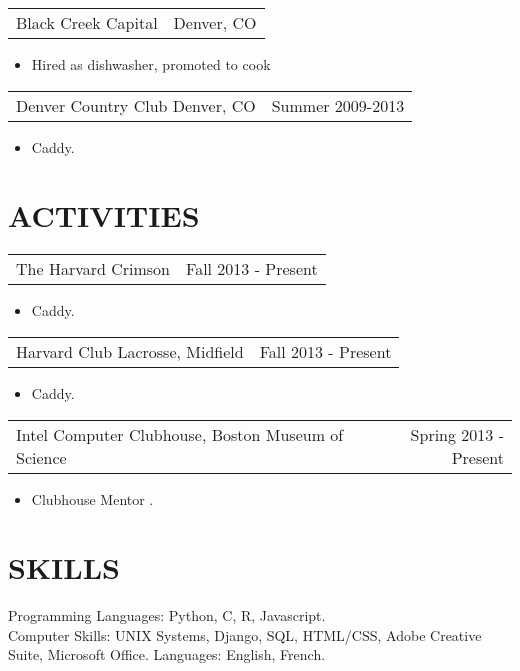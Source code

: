 \documentclass[margin]{res}
\begin{document}
\begin{resume}
		 \begin{tabular}{p{3in} r}
                 Black Creek Capital &  Denver, CO 
         \end{tabular}	
		 \begin{itemize}
                   \item[] Hired as dishwasher, promoted to cook 
         \end{itemize}

         \begin{tabular}{p{3in} r} 
          Denver Country Club Denver, CO &  Summer 2009-2013 
         \end{tabular}
         \begin{itemize}					        
                  \item[] Caddy.  
         \end{itemize}
 
\section{ACTIVITIES}
         \begin{tabular}{p{3in} r} 
                The Harvard Crimson & Fall 2013 - Present \\
         \end{tabular}
         \begin{itemize}					        
                  \item[] Caddy.  
         \end{itemize}
 
         \begin{tabular}{p{3in} r} 
                 Harvard Club Lacrosse, Midfield & Fall 2013 - Present \\
         \end{tabular}
         \begin{itemize}					        
                  \item[] Caddy.  
         \end{itemize}
 
         \begin{tabular}{p{3in} r} 
                Intel Computer Clubhouse, Boston Museum of Science & Spring 2013 - Present \\
         \end{tabular}
         \begin{itemize}					        
                  \item[] Clubhouse Mentor .  
         \end{itemize}
 


\section{SKILLS} 
                Programming Languages: Python, C, R, Javascript. \\
                Computer Skills: UNIX Systems, Django, SQL, HTML/CSS, Adobe Creative Suite, Microsoft Office.
                Languages: English, French. 
\end{resume} 
\end{document}
